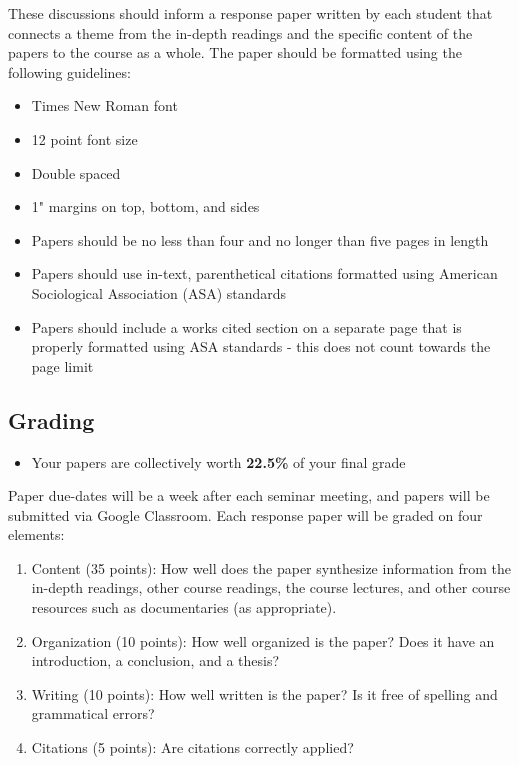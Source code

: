 \documentclass[]{book}
\providecommand{\tightlist}{%
  \setlength{\itemsep}{0pt}\setlength{\parskip}{0pt}}
\newenvironment{rmdblock}[1]
  {\begin{shaded*}
  \begin{itemize}
  \renewcommand{\labelitemi}{
    \raisebox{-.7\height}[0pt][0pt]{
      {\setkeys{Gin}{width=3em,keepaspectratio}\texttt{[image: images/\#1]}}
    }
  }
  \item
  }
  {
  \end{itemize}
  \end{shaded*}
  }
\newenvironment{rmdtip}
  {\begin{rmdblock}{tip}}
  {\end{rmdblock}}
\begin{document}
These discussions should inform a response paper written by each student that connects a theme from the in-depth readings and the specific content of the papers to the course as a whole. The paper should be formatted using the following guidelines:

\begin{itemize}
\tightlist
\item
  Times New Roman font
\item
  12 point font size
\item
  Double spaced
\item
  1" margins on top, bottom, and sides
\item
  Papers should be no less than four and no longer than five pages in length
\item
  Papers should use in-text, parenthetical citations formatted using American Sociological Association (ASA) standards
\item
  Papers should include a works cited section on a separate page that is properly formatted using ASA standards - this does not count towards the page limit
\end{itemize}

\hypertarget{grading-1}{%
\subsection{Grading}\label{grading-1}}

\begin{rmdtip}
Your papers are collectively worth \textbf{22.5\%} of your final grade
\end{rmdtip}

Paper due-dates will be a week after each seminar meeting, and papers will be submitted via Google Classroom. Each response paper will be graded on four elements:

\begin{enumerate}
\def\labelenumi{\arabic{enumi}.}
\tightlist
\item
  Content (35 points): How well does the paper synthesize information from the in-depth readings, other course readings, the course lectures, and other course resources such as documentaries (as appropriate).
\item
  Organization (10 points): How well organized is the paper? Does it have an introduction, a conclusion, and a thesis?
\item
  Writing (10 points): How well written is the paper? Is it free of spelling and grammatical errors?
\item
  Citations (5 points): Are citations correctly applied?
\end{enumerate}
\end{document}
